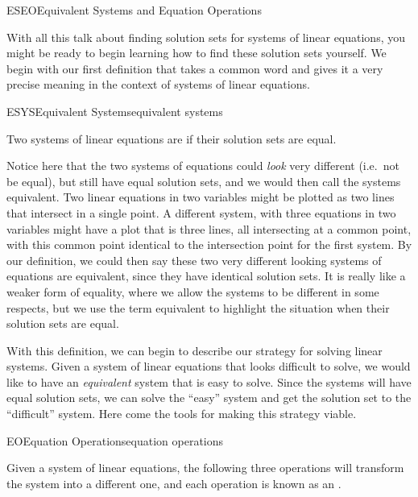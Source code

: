 \begin{subsect}{ESEO}{Equivalent Systems and Equation Operations}
%
\begin{para}With all this talk about finding solution sets for systems of linear equations, you might be ready to begin learning how to find these solution sets yourself.  We begin with our first definition that takes a common word and gives it a very precise meaning in the context of systems of linear equations.\end{para}
%
\begin{definition}{ESYS}{Equivalent Systems}{equivalent systems}
\begin{para}Two systems of linear equations are  if their solution sets are equal.\end{para}
\end{definition}
%
\begin{para}Notice here that the two systems of equations could {\em look} very different (i.e.\ not be equal), but still have equal solution sets, and we would then call the systems equivalent.   Two linear equations in two variables might be plotted as two lines that intersect in a single point.  A different system, with three equations in two variables might have a plot that is three lines, all intersecting at a common point, with this common point identical to the intersection point for the first system.  By our definition, we could then say these two very different looking systems of equations are equivalent, since they have identical solution sets.   It is really like a weaker form of equality, where we allow the systems to be different in some respects, but we use the term equivalent to highlight the situation when their solution sets are equal.\end{para}
%
\begin{para}With this definition, we can begin to describe our strategy for solving linear systems.  Given a system of linear equations that looks difficult to solve, we would like to have an {\em equivalent} system that is easy to solve.  Since the systems will have equal solution sets, we can solve the ``easy'' system and get the solution set to the ``difficult'' system.  Here come the tools for making this strategy viable.\end{para}
%
\begin{definition}{EO}{Equation Operations}{equation operations}
\begin{para}Given a system of linear equations, the following three operations will transform the system into a different one, and each operation is known as an .

\end{para}
\end{definition}
\end{subsect}
